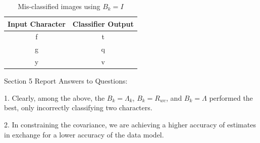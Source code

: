\documentclass{article}
\begin{document}
\begin{table}[H]
    \centering
    \begin{tabular}{|c|c|}
        \hline
        Input Character & Classifier Output \\
        \hline
        f & t \\
        \hline
        g & q \\
        \hline
        y & v \\
        \hline
    \end{tabular}
    \caption{Mis-classified images using $B_k = I$}
\end{table}

Section 5 Report Answers to Questions:

1. Clearly, among the above, the $B_k = \Lambda_k$, $B_k = R_{wc}$, and $B_k = \Lambda$ performed the best, only incorrectly classifying two characters.

2. In constraining the covariance, we are achieving a higher accuracy of estimates in exchange for a lower accuracy of the data model.
\end{document}
